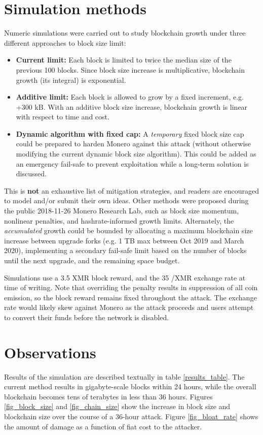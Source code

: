 \documentclass{mrl}
\begin{document}
\section{Simulation methods}
Numeric simulations were carried out to study blockchain growth under three different approaches to block size limit:
\begin{itemize}
    \item \textbf{Current limit:} Each block is limited to twice the median size of the previous 100 blocks. Since block size increase is multiplicative, blockchain growth (its integral) is exponential.
    \item \textbf{Additive limit:} Each block is allowed to grow by a fixed increment, e.g. +300 kB. With an additive block size increase, blockchain growth is linear with respect to time and cost.
    \item\textbf{Dynamic algorithm with fixed cap:} A \textit{temporary} fixed block size cap could be prepared to harden Monero against this attack (without otherwise modifying the current dynamic block size algorithm). This could be added as an emergency fail-safe to prevent exploitation while a long-term solution is discussed.
\end{itemize}
This is \textbf{not} an exhaustive list of mitigation strategies, and readers are encouraged to model and/or submit their own ideas. Other methods were proposed during the public 2018-11-26 Monero Research Lab, such as block size momentum, nonlinear penalties, and hashrate-informed growth limits. Alternately, the \emph{accumulated} growth could be bounded by allocating a maximum blockchain size increase between upgrade forks (e.g. 1 TB max between Oct 2019 and March 2020), implementing a secondary fail-safe limit based on the number of blocks until the next upgrade, and the remaining space budget.

Simulations use a 3.5 XMR block reward, and the 35 \EUR{}/XMR exchange rate at time of writing. Note that overriding the penalty results in suppression of all coin emission, so the block reward remains fixed throughout the attack. The exchange rate would likely skew against Monero as the attack proceeds and users attempt to convert their funds before the network is disabled.

\section{Observations}
Results of the simulation are described textually in table \ref{results_table}. The current method results in gigabyte-scale blocks within 24 hours, while the overall blockchain becomes tens of terabytes in less than 36 hours. Figures \ref{fig_block_size} and \ref{fig_chain_size} show the increase in block size and blockchain size over the course of a 36-hour attack. Figure \ref{fig_bloat_rate} shows the amount of damage as a function of fiat cost to the attacker.
\end{document}
